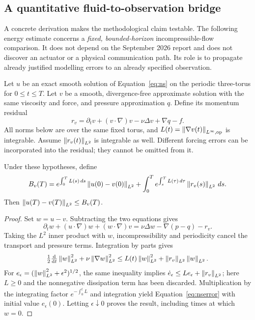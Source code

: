 \subsection{A quantitative fluid-to-observation bridge}\label{sec:nsresidual}
A concrete derivation makes the methodological claim testable. The following energy estimate concerns a \emph{fixed, bounded-horizon} incompressible-flow comparison. It does not depend on the September 2026 report and does not discover an actuator or a physical communication path. Its role is to propagate already justified modelling errors to an already specified observation.

Let $u$ be an exact smooth solution of Equation~\eqref{eq:ns} on the periodic three-torus for $0\leq t\leq T$. Let $v$ be a smooth, divergence-free approximate solution with the same viscosity and force, and pressure approximation $q$. Define its momentum residual
\begin{equation}\label{eq:nsresidual}
 r_v=\partial_t v+(v\cdot\nabla)v-\nu\Delta v+\nabla q-f.
\end{equation}
All norms below are over the same fixed torus, and $L(t)=\left\lVert\nabla v(t)\right\rVert_{L^\infty,\mathrm{op}}$ is integrable. Assume $\left\lVert r_v(t)\right\rVert_{L^2}$ is integrable as well. Different forcing errors can be incorporated into the residual; they cannot be omitted from it.

\begin{proposition}\label{prop:nsresidual}
Under these hypotheses, define
\begin{equation}\label{eq:nserror}
 B_v(T)=e^{\int_0^T L(s)\,ds}\left\lVert u(0)-v(0)\right\rVert_{L^2}
 +\int_0^T e^{\int_s^T L(\tau)\,d\tau}\left\lVert r_v(s)\right\rVert_{L^2}\,ds.
\end{equation}
Then $\left\lVert u(T)-v(T)\right\rVert_{L^2}\leq B_v(T)$.
\end{proposition}
\begin{proof}
Set $w=u-v$. Subtracting the two equations gives
\[
 \partial_t w+(u\cdot\nabla)w+(w\cdot\nabla)v
 =\nu\Delta w-\nabla(p-q)-r_v.
\]
Taking the $L^2$ inner product with $w$, incompressibility and periodicity cancel the transport and pressure terms. Integration by parts gives
\[
 \tfrac12\tfrac{\mathrm d}{\mathrm dt}\left\lVert w\right\rVert_{L^2}^{2}
 +\nu\left\lVert\nabla w\right\rVert_{L^2}^{2}
 \leq L(t)\left\lVert w\right\rVert_{L^2}^{2}+\left\lVert r_v\right\rVert_{L^2}\left\lVert w\right\rVert_{L^2}.
\]
For $e_\epsilon=(\left\lVert w\right\rVert_{L^2}^2+\epsilon^2)^{1/2}$, the same inequality implies
$\dot e_\epsilon\leq L e_\epsilon+\left\lVert r_v\right\rVert_{L^2}$; here $L\geq0$ and the nonnegative dissipation term has been discarded. Multiplication by the integrating factor $e^{-\int_0^tL}$ and integration yield Equation~\eqref{eq:nserror} with initial value $e_\epsilon(0)$. Letting $\epsilon\downarrow0$ proves the result, including times at which $w=0$.
\end{proof}


